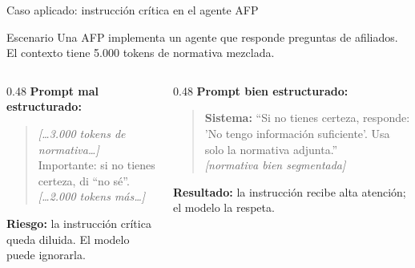 \documentclass[aspectratio=169, 10pt]{beamer}
\begin{document}
\begin{frame}{Caso aplicado: instrucción crítica en el agente AFP}

  \begin{block}{Escenario}
    Una AFP implementa un agente que responde preguntas de afiliados. El contexto tiene 5.000 tokens de normativa mezclada.
  \end{block}

  \vspace{0.4em}
  \begin{columns}[T]
    \begin{column}{0.48\textwidth}
      {\color{fenred}\textbf{Prompt mal estructurado:}}
      \vspace{0.2em}

      \begin{quote}\small
        \textit{[\ldots 3.000 tokens de normativa\ldots]}\\
        Importante: si no tienes certeza, di ``no sé''.\\
        \textit{[\ldots 2.000 tokens más\ldots]}
      \end{quote}

      \vspace{0.1em}
      {\color{fenred}\textbf{Riesgo:}} la instrucción crítica queda diluida. El modelo puede ignorarla.
    \end{column}
    \begin{column}{0.48\textwidth}
      {\color{fenblue}\textbf{Prompt bien estructurado:}}
      \vspace{0.2em}

      \begin{quote}\small
        \textbf{Sistema:} ``Si no tienes certeza, responde: 'No tengo información suficiente'. Usa solo la normativa adjunta.''\\
        \textit{[normativa bien segmentada]}
      \end{quote}

      \vspace{0.1em}
      {\color{fenblue}\textbf{Resultado:}} la instrucción recibe alta atención; el modelo la respeta.
    \end{column}
  \end{columns}

\end{frame}

\end{document}
